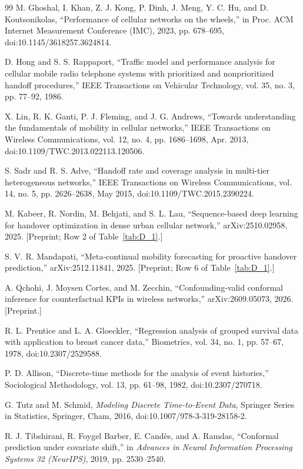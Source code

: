 \begin{thebibliography}{99}
 M. Ghoshal, I. Khan, Z. J. Kong, P. Dinh, J. Meng, Y. C. Hu, and D. Koutsonikolas, ``Performance of cellular networks on the wheels,'' in Proc. ACM Internet Measurement Conference (IMC), 2023, pp. 678--695, doi:10.1145/3618257.3624814.

 D. Hong and S. S. Rappaport, ``Traffic model and performance analysis for cellular mobile radio telephone systems with prioritized and nonprioritized handoff procedures,'' IEEE Transactions on Vehicular Technology, vol. 35, no. 3, pp. 77--92, 1986.

 X. Lin, R. K. Ganti, P. J. Fleming, and J. G. Andrews, ``Towards understanding the fundamentals of mobility in cellular networks,'' IEEE Transactions on Wireless Communications, vol. 12, no. 4, pp. 1686--1698, Apr. 2013, doi:10.1109/TWC.2013.022113.120506.

 S. Sadr and R. S. Adve, ``Handoff rate and coverage analysis in multi-tier heterogeneous networks,'' IEEE Transactions on Wireless Communications, vol. 14, no. 5, pp. 2626--2638, May 2015, doi:10.1109/TWC.2015.2390224.

 M. Kabeer, R. Nordin, M. Behjati, and S. L. Lau, ``Sequence-based deep learning for handover optimization in dense urban cellular network,'' arXiv:2510.02958, 2025. [Preprint; Row 2 of Table~\ref{tab:D_1}.]

 S. V. R. Mandapati, ``Meta-continual mobility forecasting for proactive handover prediction,'' arXiv:2512.11841, 2025. [Preprint; Row 6 of Table~\ref{tab:D_1}.]

 A. Qchohi, J. Moysen Cortes, and M. Zecchin, ``Confounding-valid conformal inference for counterfactual KPIs in wireless networks,'' arXiv:2609.05073, 2026. [Preprint.]

 R. L. Prentice and L. A. Gloeckler, ``Regression analysis of grouped survival data with application to breast cancer data,'' Biometrics, vol. 34, no. 1, pp. 57--67, 1978, doi:10.2307/2529588.

 P. D. Allison, ``Discrete-time methods for the analysis of event histories,'' Sociological Methodology, vol. 13, pp. 61--98, 1982, doi:10.2307/270718.

 G. Tutz and M. Schmid, \textit{Modeling Discrete Time-to-Event Data}, Springer Series in Statistics, Springer, Cham, 2016, doi:10.1007/978-3-319-28158-2.

 R. J. Tibshirani, R. Foygel Barber, E. Cand\`es, and A. Ramdas, ``Conformal prediction under covariate shift,'' in \textit{Advances in Neural Information Processing Systems 32 (NeurIPS)}, 2019, pp. 2530--2540.


\end{thebibliography}
